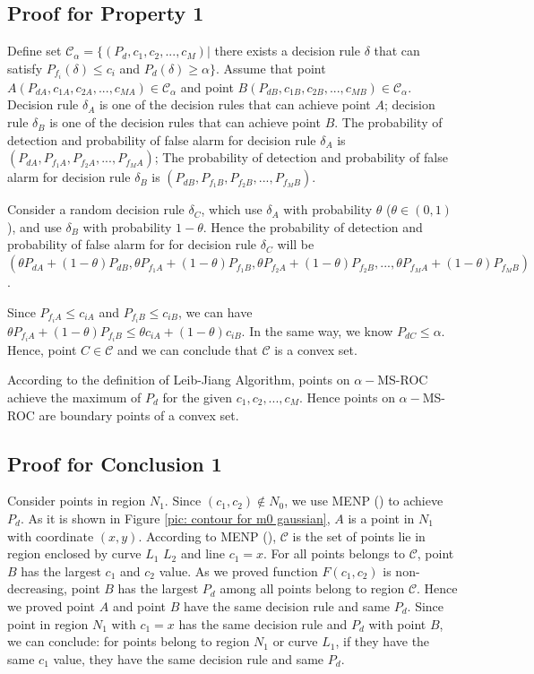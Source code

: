 \documentclass[12pt,journal,a4paper,twoside,onecolumn,draft]{IEEEtran}
\newcommand{\rmnum}[1]{\romannumeral #1}
\begin{document}
\begin{spacing}{2.5}
\subsection{Proof for Property 1}
Define set $\mathcal{C}_\alpha = \{
(P_d, c_1, c_2, ..., c_M)|$ there exists a decision rule $\delta$ that can satisfy $P_{f_i}(\delta) \leq c_i$  and $P_d(\delta) \geq \alpha
\}$.
Assume that point $A(P_{dA}, c_{1A}, c_{2A}, ..., c_{MA}) \in \mathcal{C}_\alpha$ and point $B(P_{dB}, c_{1B}, c_{2B}, ..., c_{MB}) \in \mathcal{C}_\alpha$. Decision rule $\delta_A$ is one of the decision rules that can achieve point $A$; decision rule $\delta_B$ is one of the decision rules that can achieve point $B$. The probability of detection and probability of false alarm for decision rule $\delta_A$ is $(P_{dA}, P_{f_1A}, P_{f_2A}, ..., P_{f_MA})$; The probability of detection and probability of false alarm for decision rule $\delta_B$ is $(P_{dB}, P_{f_1B}, P_{f_2B}, ..., P_{f_MB})$.

Consider a random decision rule $\delta_C$, which use $\delta_A$ with probability $\theta$ ($\theta \in (0, 1)$), and use $\delta_B$ with probability $1 - \theta$. Hence the probability of detection and probability of false alarm for for decision rule $\delta_C$ will be $(\theta P_{dA} + (1 - \theta)P_{dB}, \theta P_{f_1A} + (1 - \theta)P_{f_1B}, \theta P_{f_2A} + (1 - \theta)P_{f_2B}, ..., \theta P_{f_MA} + (1 - \theta)P_{f_MB})$.

Since $P_{f_iA} \leq c_{iA}$ and $P_{f_iB} \leq c_{iB}$, we can have $\theta P_{f_iA} + (1 - \theta)P_{f_iB} \leq \theta c_{iA} + (1 - \theta)c_{iB}$. In the same way, we know $P_{dC} \leq \alpha$. Hence, point $C \in \mathcal{C}$ and  we can conclude that $\mathcal{C}$ is a convex set.

According to the definition of Leib-Jiang Algorithm, points on $\alpha-$MS-ROC achieve the maximum of $P_d$ for the given $c_1, c_2, ..., c_M$. Hence points on  $\alpha-$MS-ROC are boundary points of  a convex set.

\subsection{Proof for Conclusion 1}

Consider points in region $N_1$. Since $(c_1, c_2) \notin N_0$, we use MENP (\rmnum{2}) to achieve $P_d$. As it is shown in Figure \ref{pic: contour for m0 gaussian}, $A$ is a point in $N_1$ with coordinate $(x, y)$. According to MENP (\rmnum{2}), $\mathcal{C}$ is the set of points lie in region enclosed by curve $L_1$ $L_2$ and line $c_1 = x$. For all points belongs to $\mathcal{C}$, point $B$ has the largest $c_1$ and $c_2$ value. As we proved function $F(c_1, c_2)$ is non-decreasing, point $B$ has the largest $P_d$ among all points belong to region $\mathcal{C}$. Hence we proved point $A$ and point $B$ have the same decision rule and same $P_d$. Since point in region $N_1$ with $c_1 = x$ has the same decision rule and $P_d$ with point $B$, we can conclude: for points belong to region $N_1$ or curve $L_1$, if they have the same $c_1$ value, they have the same decision rule and same $P_d$.


\end{spacing}
\end{document}
